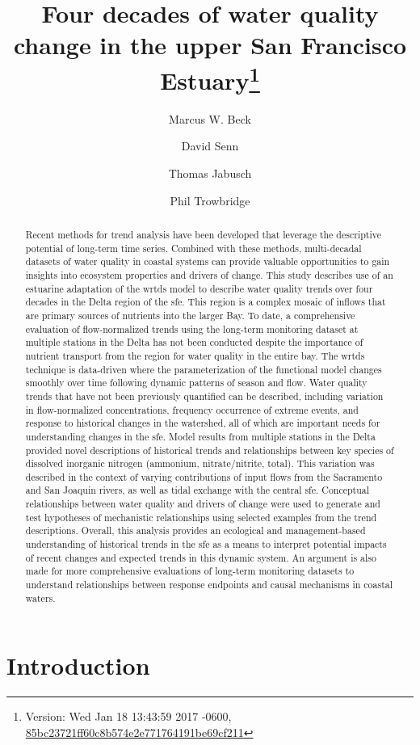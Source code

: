 \documentclass[journal = esthag, manuscript = article]{achemso}\usepackage[]{graphicx}\usepackage[]{color}
\author{Marcus W. Beck}
\affiliation{USEPA National Health and Environmental Effects Research Laboratory, Gulf Ecology Division, Gulf Breeze, FL}
\author{David Senn}
\author{Thomas Jabusch}
\author{Phil Trowbridge}
\affiliation{San Francisco Estuary Institute, Richmond, CA}
\title[Water quality change in the upper SFE]{Four decades of water quality change in the upper San Francisco Estuary\footnote{Version: Wed Jan 18 13:43:59 2017 -0600, \href{https://github.com/fawda123/sftrends_manu/commit/85bc23721ff60c8b574e2e771764191be69cf211}{85bc23721ff60c8b574e2e771764191be69cf211}}}
\begin{document}
\linenumbers

\begin{abstract}
\noindent Recent methods for trend analysis have been developed that leverage the descriptive potential of long-term time series.  Combined with these methods, multi-decadal datasets of water quality in coastal systems can provide valuable opportunities to gain insights into ecosystem properties and drivers of change.  This study describes use of an estuarine adaptation of the \ac{wrtds} model to describe water quality trends over four decades in the Delta region of the \ac{sfe}. This region is a complex mosaic of inflows that are primary sources of nutrients into the larger Bay.  To date, a comprehensive evaluation of flow-normalized trends using the long-term monitoring dataset at multiple stations in the Delta has not been conducted despite the importance of nutrient transport from the region for water quality in the entire bay.  The \ac{wrtds} technique is data-driven where the parameterization of the functional model changes smoothly over time following dynamic patterns of season and flow.  Water quality trends that have not been previously quantified can be described, including variation in flow-normalized concentrations, frequency occurrence of extreme events, and response to historical changes in the watershed, all of which are important needs for understanding changes in the \ac{sfe}.  Model results from multiple stations in the Delta provided novel descriptions of historical trends and relationships between key species of dissolved inorganic nitrogen (ammonium, nitrate/nitrite, total).  This variation was described in the context of varying contributions of input flows from the Sacramento and San Joaquin rivers, as well as tidal exchange with the central \ac{sfe}.  Conceptual relationships between water quality and drivers of change were used to generate and test hypotheses of mechanistic relationships using selected examples from the trend descriptions. Overall, this analysis provides an ecological and management-based understanding of historical trends in the \ac{sfe} as a means to interpret potential impacts of recent changes and expected trends in this dynamic system.  An argument is also made for more comprehensive evaluations of long-term monitoring datasets to understand relationships between response endpoints and causal mechanisms in coastal waters.
\end{abstract}
\acresetall

\section{Introduction}
\end{document}
